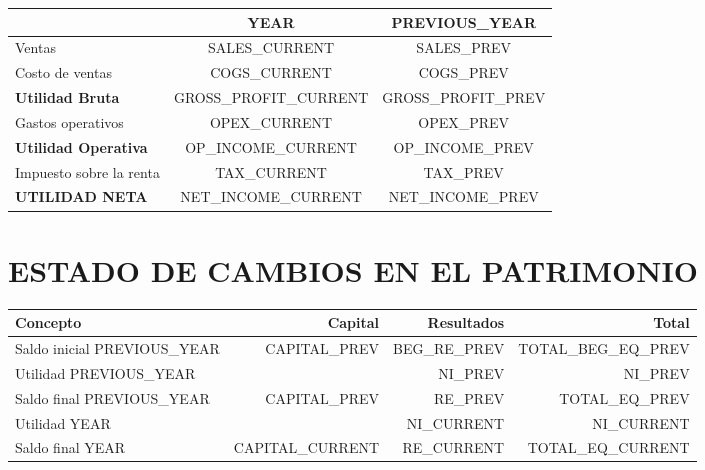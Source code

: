 \documentclass[10pt,letterpaper]{article}
\begin{document}
\begin{tabularx}{\textwidth}{X S S}

\toprule
 & {{{YEAR}}} & {{{PREVIOUS_YEAR}}} \\
\midrule

Ventas & {{SALES_CURRENT}} & {{SALES_PREV}} \\
Costo de ventas & {{COGS_CURRENT}} & {{COGS_PREV}} \\

\textbf{Utilidad Bruta} & {{GROSS_PROFIT_CURRENT}} & {{GROSS_PROFIT_PREV}} \\

Gastos operativos & {{OPEX_CURRENT}} & {{OPEX_PREV}} \\

\textbf{Utilidad Operativa} & {{OP_INCOME_CURRENT}} & {{OP_INCOME_PREV}} \\

Impuesto sobre la renta & {{TAX_CURRENT}} & {{TAX_PREV}} \\

\textbf{UTILIDAD NETA} & {{NET_INCOME_CURRENT}} & {{NET_INCOME_PREV}} \\

\bottomrule
\end{tabularx}

\newpage


\section{ESTADO DE CAMBIOS EN EL PATRIMONIO}

\begin{tabular}{lrrr}

\toprule
Concepto & Capital & Resultados & Total \\
\midrule

Saldo inicial {{PREVIOUS_YEAR}} & {{CAPITAL_PREV}} & {{BEG_RE_PREV}} & {{TOTAL_BEG_EQ_PREV}} \\

Utilidad {{PREVIOUS_YEAR}} & & {{NI_PREV}} & {{NI_PREV}} \\

Saldo final {{PREVIOUS_YEAR}} & {{CAPITAL_PREV}} & {{RE_PREV}} & {{TOTAL_EQ_PREV}} \\

Utilidad {{YEAR}} & & {{NI_CURRENT}} & {{NI_CURRENT}} \\

Saldo final {{YEAR}} & {{CAPITAL_CURRENT}} & {{RE_CURRENT}} & {{TOTAL_EQ_CURRENT}} \\

\bottomrule

\end{tabular}
\end{document}
